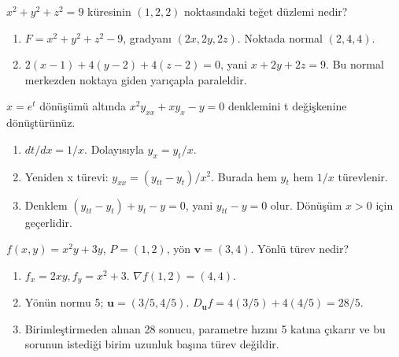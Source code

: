 \begin{tcolorbox}[title={Örnek 6.7 | Kapalı denklemin teğet düzlemi},colframe=accent]\(x^2+y^2+z^2=9\) küresinin \((1,2,2)\) noktasındaki teğet düzlemi nedir?
\par\vspace{1mm}{\scriptsize\sffamily Pekiştirme}\end{tcolorbox}
\begin{tcolorbox}[title={Adım adım çözüm},colback=green!3!white,colframe=green]\begin{enumerate}
\item \(F=x^2+y^2+z^2-9\), gradyanı \((2x,2y,2z)\). Noktada normal \((2,4,4)\).
\item \(2(x-1)+4(y-2)+4(z-2)=0\), yani \(x+2y+2z=9\). Bu normal merkezden noktaya giden yarıçapla paraleldir.
\end{enumerate}\end{tcolorbox}
\begin{tcolorbox}[title={Örnek 6.8 | Dersteki diferansiyel denklem dönüşümü},colframe=accent]\(x=e^t\) dönüşümü altında \(x^2y_{xx}+xy_x-y=0\) denklemini t değişkenine dönüştürünüz.
\par{}\end{tcolorbox}
\begin{tcolorbox}[title={Adım adım çözüm},colback=green!3!white,colframe=green]\begin{enumerate}
\item \(dt/dx=1/x\). Dolayısıyla \(y_x=y_t/x\).
\item Yeniden x türevi: \(y_{xx}=(y_{tt}-y_t)/x^2\). Burada hem \(y_t\) hem \(1/x\) türevlenir.
\item Denklem \((y_{tt}-y_t)+y_t-y=0\), yani \(y_{tt}-y=0\) olur. Dönüşüm \(x>0\) için geçerlidir.
\end{enumerate}\end{tcolorbox}
\begin{tcolorbox}[title={Örnek 6.9 | Birim olmayan yönden yönlü türev},colframe=accent]\(f(x,y)=x^2y+3y\), \(P=(1,2)\), yön \(\mathbf v=(3,4)\). Yönlü türev nedir?
\par\vspace{1mm}{\scriptsize\sffamily Pekiştirme}\end{tcolorbox}
\begin{tcolorbox}[title={Adım adım çözüm},colback=green!3!white,colframe=green]\begin{enumerate}
\item \(f_x=2xy,f_y=x^2+3\). \(\nabla f(1,2)=(4,4)\).
\item Yönün normu 5; \(\mathbf u=(3/5,4/5)\). \(D_{\mathbf u}f=4(3/5)+4(4/5)=28/5\).
\item Birimleştirmeden alınan 28 sonucu, parametre hızını 5 katına çıkarır ve bu sorunun istediği birim uzunluk başına türev değildir.
\end{enumerate}\end{tcolorbox}
